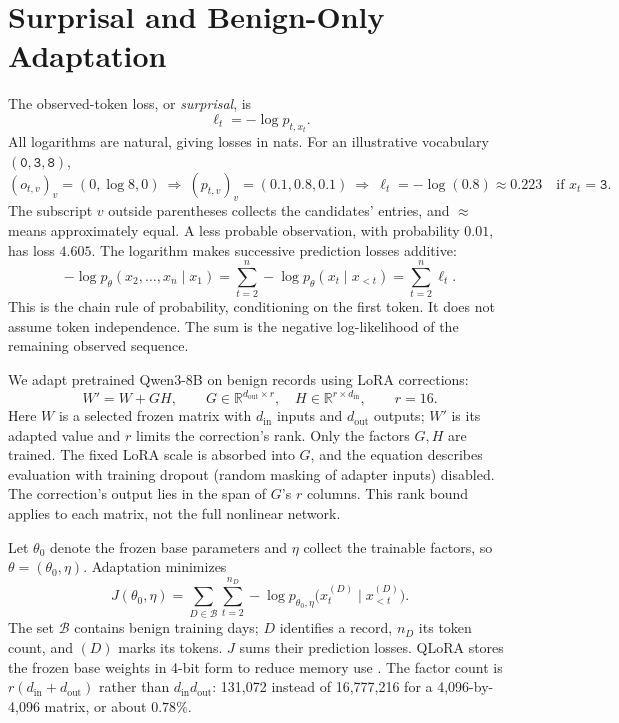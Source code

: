 \documentclass[12pt]{report}
\begin{document}
\section{Surprisal and Benign-Only Adaptation}
\label{sec:lm-train}
The observed-token loss, or \emph{surprisal}, is
\begin{equation}
\ell_t=-\log p_{t,x_t}.
\label{eq:lm-surprisal}
\end{equation}
All logarithms are natural, giving losses in nats. For an illustrative
vocabulary $(\texttt{0},\texttt{3},\texttt{8})$,
\[
(o_{t,v})_v=(0,\log 8,0)
\ \Longrightarrow\ (p_{t,v})_v=(0.1,0.8,0.1)
\ \Longrightarrow\ \ell_t=-\log(0.8)\approx0.223
\quad\text{if }x_t=\texttt{3}.
\]
The subscript $v$ outside parentheses collects the candidates' entries,
and $\approx$ means approximately equal.
A less probable observation, with probability $0.01$, has loss $4.605$.
The logarithm makes successive prediction losses additive:
\begin{equation}
-\log p_\theta(x_2,\ldots,x_n\mid x_1)
 =\sum_{t=2}^{n}-\log p_\theta(x_t\mid x_{<t})
 =\sum_{t=2}^{n}\ell_t.
\label{eq:lm-chain-rule}
\end{equation}
This is the chain rule of probability, conditioning on the first token.
It does not assume token independence. The sum is the negative
log-likelihood of the remaining observed sequence.

We adapt pretrained Qwen3-8B on benign records using LoRA corrections:
\begin{equation}
W'=W+GH,\qquad
G\in\mathbb R^{d_{\mathrm{out}}\times r},\quad
H\in\mathbb R^{r\times d_{\mathrm{in}}},\qquad r=16.
\label{eq:lm-lora}
\end{equation}
Here $W$ is a selected frozen matrix with $d_{\mathrm{in}}$ inputs
and $d_{\mathrm{out}}$ outputs; $W'$ is its adapted value and
$r$ limits the correction's rank.
Only the factors $G,H$ are trained. The fixed LoRA scale is absorbed
into $G$, and the equation describes evaluation with training dropout
(random masking of adapter inputs) disabled.
The correction's output lies in the span of $G$'s $r$ columns.
This rank bound applies to each matrix, not the full nonlinear network.

Let $\theta_0$ denote the frozen base parameters and $\eta$ collect
the trainable factors, so $\theta=(\theta_0,\eta)$. Adaptation minimizes
\begin{equation}
J(\theta_0,\eta)=
\sum_{D\in\mathcal B}\sum_{t=2}^{n_D}
-\log p_{\theta_0,\eta}\bigl(x_t^{(D)}\mid x_{<t}^{(D)}\bigr).
\label{eq:lm-objective}
\end{equation}
The set $\mathcal B$ contains benign training days; $D$ identifies a
record, $n_D$ its token count, and $(D)$ marks its tokens.
$J$ sums their prediction losses. QLoRA stores the frozen base weights
in 4-bit form to reduce memory use \cite{hu2022lora,dettmers2023qlora}.
The factor count is $r(d_{\mathrm{in}}+d_{\mathrm{out}})$ rather than
$d_{\mathrm{in}}d_{\mathrm{out}}$: 131,072 instead of 16,777,216 for
a 4,096-by-4,096 matrix, or about $0.78\%$.
\end{document}
